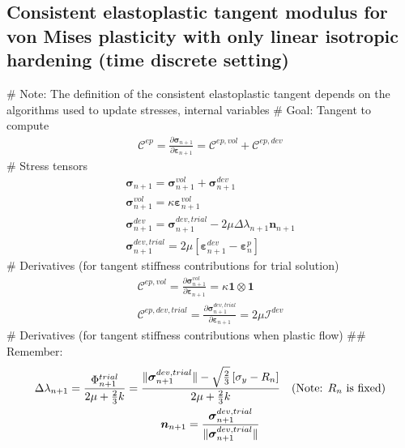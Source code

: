 \documentclass[]{scrartcl}
\begin{document}
\subsection{Consistent elastoplastic tangent modulus for von Mises plasticity with only linear isotropic hardening (time discrete setting)}
\begin{easylist}
# Note: The definition of the consistent elastoplastic tangent depends on the algorithms used to update stresses, internal variables
# Goal: Tangent to compute
\begin{gather*}
 \boldsymbol{\mathcal{C}}^{ep} 
  = \frac{\partial \boldsymbol{\sigma}_{n+1}}{\partial \boldsymbol{\varepsilon}_{n+1}}
  = \boldsymbol{\mathcal{C}}^{ep, vol} + \boldsymbol{\mathcal{C}}^{ep, dev}
\end{gather*}
# Stress tensors
\begin{gather*}
\boldsymbol{\sigma}_{n+1}
  = \boldsymbol{\sigma}^{vol}_{n+1} + \boldsymbol{\sigma}^{dev}_{n+1} \\
\boldsymbol{\sigma}^{vol}_{n+1}
  = \kappa \boldsymbol{\varepsilon}^{vol}_{n+1} \\
\boldsymbol{\sigma}^{dev}_{n+1}
  = \boldsymbol{\sigma}^{dev, trial}_{n+1}
  - 2 \mu \Delta \lambda_{n+1} \boldsymbol{n}_{n+1} \\
\boldsymbol{\sigma}^{dev, trial}_{n+1}
  = 2 \mu \left[ \boldsymbol{\varepsilon}^{dev}_{n+1} - \boldsymbol{\varepsilon}^{p}_{n} \right]
\end{gather*}
# Derivatives (for tangent stiffness contributions for trial solution)
\begin{gather*}
\boldsymbol{\mathcal{C}}^{ep, vol}
  = \frac{\partial \boldsymbol{\sigma}^{vol}_{n+1}}{\partial \boldsymbol{\varepsilon}_{n+1}}
  = \kappa \boldsymbol{1} \otimes \boldsymbol{1} \\
\boldsymbol{\mathcal{C}}^{ep, dev, trial}
  = \frac{\partial \boldsymbol{\sigma}^{dev, trial}_{n+1}}{\partial \boldsymbol{\varepsilon}_{n+1}}
  = 2 \mu \boldsymbol{\mathcal{I}}^{dev}
\end{gather*}
# Derivatives (for tangent stiffness contributions when plastic flow)
## Remember:
\begin{gather*}
\Delta \lambda_{n+1}
  = \frac{\Phi^{trial}_{n+1}}{2 \mu + \frac{2}{3} k}
  = \frac{\Vert \boldsymbol{\sigma}^{dev, trial}_{n+1} \Vert - \sqrt{\frac{2}{3}} \left[ \sigma_{y} - R_{n} \right]}{2 \mu + \frac{2}{3} k}
\quad \textnormal{(Note: $R_{n}$ is fixed)} \\
\boldsymbol{n}_{n+1}
  = \dfrac{\boldsymbol{\sigma}^{dev, trial}_{n+1}}{\Vert \boldsymbol{\sigma}^{dev, trial}_{n+1} \Vert}

\end{gather*}
\end{easylist}
\end{document}
